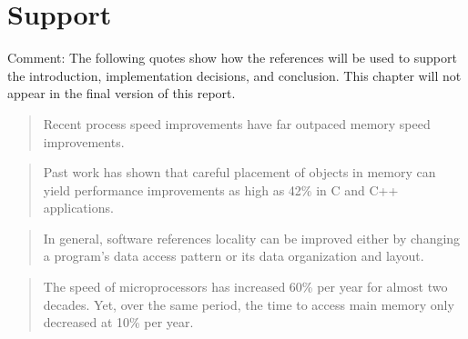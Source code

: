 \documentclass[a4paper,oneside]{memoir}
\newcommand{\makecomment}[1]{{\color{red} Comment: #1}}
\begin{document}
%
%
%
%
%
%

\chapter*{Support}

\makecomment{The following quotes show how the references will be used to support
the introduction, implementation decisions, and conclusion. This chapter will
not appear in the final version of this report.}

\blockquote{Recent process speed improvements have far outpaced memory speed
improvements.}\cite{Novark:2006}

\blockquote{Past work has shown that careful placement of objects in memory can
yield performance improvements as high as 42\% in C and C++ applications.}
\cite{Novark:2006}

\blockquote{In general, software references locality can be improved either by
changing a program's data access pattern or its data organization and layout.}
\cite{Chilimbi:1999}

\blockquote{The speed of microprocessors has increased 60\% per year for almost
two decades. Yet, over the same period, the time to access main memory only
decreased at 10\% per year.}
\cite{Chilimbi:1999}
\end{document}
